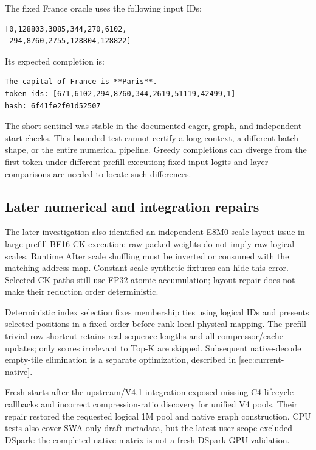 \documentclass[sigplan,10pt]{acmart}
\begin{document}
The fixed France oracle uses the following input IDs:

\begin{lstlisting}
[0,128803,3085,344,270,6102,
 294,8760,2755,128804,128822]
\end{lstlisting}

Its expected completion is:

\begin{lstlisting}
The capital of France is **Paris**.
token ids: [671,6102,294,8760,344,2619,51119,42499,1]
hash: 6f41fe2f01d52507
\end{lstlisting}

The short sentinel was stable in the documented eager, graph, and independent-start checks. This bounded test cannot certify a long context, a different batch shape, or the entire numerical pipeline. Greedy completions can diverge from the first token under different prefill execution; fixed-input logits and layer comparisons are needed to locate such differences.

\subsection{Later numerical and integration repairs}

The later investigation also identified an independent E8M0 scale-layout issue in large-prefill BF16-CK execution: raw packed weights do not imply raw logical scales. Runtime AIter scale shuffling must be inverted or consumed with the matching address map. Constant-scale synthetic fixtures can hide this error. Selected CK paths still use FP32 atomic accumulation; layout repair does not make their reduction order deterministic.

Deterministic index selection fixes membership ties using logical IDs and presents selected positions in a fixed order before rank-local physical mapping. The prefill trivial-row shortcut retains real sequence lengths and all compressor/cache updates; only scores irrelevant to Top-K are skipped. Subsequent native-decode empty-tile elimination is a separate optimization, described in \cref{sec:current-native}.

Fresh starts after the upstream/V4.1 integration exposed missing C4 lifecycle callbacks and incorrect compression-ratio discovery for unified V4 pools. Their repair restored the requested logical 1M pool and native graph construction. CPU tests also cover SWA-only draft metadata, but the latest user scope excluded DSpark: the completed native matrix is not a fresh DSpark GPU validation.
\end{document}
